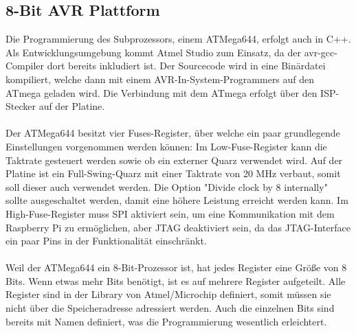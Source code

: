 \documentclass[12pt]{article}
\begin{document}
\subsection{8-Bit AVR Plattform}
Die Programmierung des Subprozessors, einem ATMega644, erfolgt auch in C++. Als 
Entwicklungsumgebung kommt Atmel Studio zum Einsatz, da der avr-gcc-Compiler dort bereits inkludiert ist. Der Sourcecode wird in eine Binärdatei kompiliert, welche dann mit einem AVR-In-System-Programmers auf den ATmega geladen wird. Die Verbindung mit dem ATmega erfolgt über den ISP-Stecker auf der Platine. 
\\\\Der ATMega644 besitzt vier Fuses-Register, über welche ein paar grundlegende Einstellungen vorgenommen werden können: Im Low-Fuse-Register kann die Taktrate gesteuert werden sowie ob ein externer Quarz verwendet wird. Auf der Platine ist ein Full-Swing-Quarz mit einer Taktrate von 20 MHz verbaut, somit soll dieser auch verwendet werden. Die Option "Divide clock by 8 internally" sollte ausgeschaltet werden, damit eine höhere Leistung erreicht werden kann. Im High-Fuse-Register muss SPI aktiviert sein, um eine Kommunikation mit dem Raspberry Pi zu ermöglichen, aber JTAG deaktiviert sein, da das JTAG-Interface ein paar Pins in der Funktionalität einschränkt.
\\\\Weil der ATMega644 ein 8-Bit-Prozessor ist, hat jedes Register eine Größe von 8 Bits. Wenn etwas mehr Bits benötigt, ist es auf mehrere Register aufgeteilt. Alle Register sind in der Library von Atmel/Microchip definiert, somit müssen sie nicht über die Speicheradresse adressiert werden. Auch die einzelnen Bits sind bereits mit Namen definiert, was die Programmierung wesentlich erleichtert. 
\end{document}
